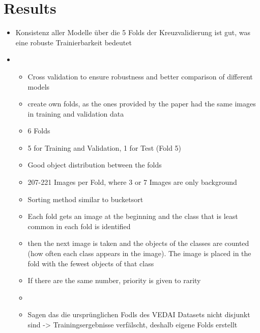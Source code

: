 \chapter{Results}
\label{ch:results}

\begin{itemize}
    \item Konsistenz aller Modelle über die 5 Folds der Kreuzvalidierung ist gut, was eine robuste Trainierbarkeit bedeutet
    \item {}
    \begin{itemize}
        \item Cross validation to ensure robustness and better comparison of different models
        \item create own folds, as the ones provided by the paper had the same images in training and validation data
        \item  6 Folds
        \item 5 for Training and Validation, 1 for Test (Fold 5)
        \item Good object distribution between the folds
        \item 207-221 Images per Fold, where 3 or 7 Images are only background
        
        \item Sorting method similar to bucketsort
        \item Each fold gets an image at the beginning and the class that is least common in each fold is identified
        \item then the next image is taken and the objects of the classes are counted (how often each class appears in the image). The image is placed in the fold with the fewest objects of that class
        \item If there are the same number, priority is given to rarity
        \item {}
        \item Sagen das die ursprünglichen Fodls des VEDAI Datasets nicht disjunkt sind -> Trainingsergebnisse verfälscht, deshalb eigene Folds erstellt
    \end{itemize}
\end{itemize}
